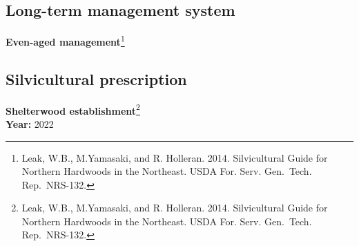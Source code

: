 \documentclass[]{tufte-handout}
\begin{document}
\subsection{Long-term management
system}\label{long-term-management-system}

\textbf{Even-aged management}\footnote{Leak, W.B., M.Yamasaki, and R.
  Holleran. 2014. Silvicultural Guide for Northern Hardwoods in the
  Northeast. USDA For. Serv. Gen.~Tech. Rep.~NRS-132.}

\subsection{Silvicultural
prescription}\label{silvicultural-prescription}

\textbf{Shelterwood establishment}\footnote{Leak, W.B., M.Yamasaki, and
  R. Holleran. 2014. Silvicultural Guide for Northern Hardwoods in the
  Northeast. USDA For. Serv. Gen.~Tech. Rep.~NRS-132.}\\
\textbf{Year:} 2022

\newpage
\end{document}
